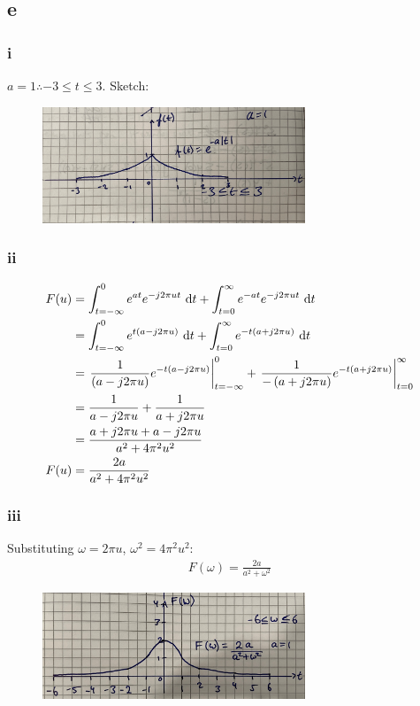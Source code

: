 \documentclass[11pt]{article}
\numberwithin{equation}{section}
\begin{document}
\subsection*{e}
\subsubsection*{i}
$a =1 \therefore -3 \leq t \leq 3$. Sketch:
\begin{figure}[H]
	\centering
	\includegraphics[width = 0.7\textwidth]{./img/q1ei.JPG}
	\caption{}
\end{figure}
\subsubsection*{ii}
\begin{align}
	F(u) &= \int_{t=-\infty}^{0}e^{at}e^{-j2\pi u t}  \,\dif t + \int_{t=0}^{\infty} e^{-at} e^{-j2\pi u t}\,\dif t\\
	&= \int_{t=-\infty}^{0}e^{t(a - j2\pi u)}  \,\dif t + \int_{t=0}^{\infty} e^{-t(a + j2\pi u)}\,\dif t\\
	&= \left. \frac{1}{\left(a - j2\pi u\right)}e^{-t\left(a - j2\pi u\right)} \right|_{t = -\infty}^0 + \left. \frac{1}{-\left(a + j2\pi u\right)}e^{-t\left(a + j2\pi u\right)} \right|_{t=0}^\infty\\
	&= \frac{1}{a - j2\pi u} + \frac{1}{a + j2\pi u}\\
	&= \frac{a + j2\pi u + a - j2\pi u}{a^2 + 4\pi^2 u^2}\\
	F(u) &= \frac{2a}{a^2 + 4\pi^2u^2}
\end{align}
\subsubsection*{iii}
Substituting $\omega = 2\pi u$, $\omega^2 = 4\pi^2 u^2$:
\begin{align}
	F(\omega) = \frac{2a}{a^2 + \omega^2}
\end{align}
\begin{figure}[H]
	\centering
	\includegraphics[width = 0.7\textwidth]{./img/q1eiii.JPG}
	\caption{}
\end{figure}
\end{document}
